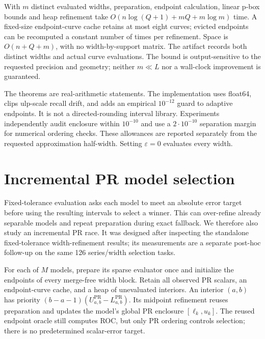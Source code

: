 With $m$ distinct evaluated widths, preparation, endpoint calculation,
linear p-box bounds and heap refinement take
$O(n\log(Q+1)+mQ+m\log m)$ time.
A fixed-size endpoint-curve cache retains at most eight curves; evicted
endpoints can be recomputed a constant number of times per refinement.
Space is $O(n+Q+m)$, with no width-by-support matrix.
The artifact records both distinct widths and actual curve evaluations.
The bound is output-sensitive to the requested precision and geometry;
neither $m\ll L$ nor a wall-clock improvement is guaranteed.

The theorems are real-arithmetic statements. The implementation uses
float64, clips ulp-scale recall drift, and adds an empirical $10^{-12}$
guard to adaptive endpoints. It is not a directed-rounding interval library.
Experiments independently audit enclosure within $10^{-10}$ and use a
$2\cdot10^{-10}$ separation margin for numerical ordering checks.
These allowances are reported separately from the requested approximation
half-width. Setting $\varepsilon=0$ evaluates every width.

\section{Incremental PR model selection}
\label{sec:racing}
Fixed-tolerance evaluation asks each model to meet an absolute error target
before using the resulting intervals to select a winner. This can over-refine
already separable models and repeat preparation during exact fallback.
We therefore also study an incremental PR race. It was designed after
inspecting the standalone fixed-tolerance width-refinement results;
its measurements are a separate
post-hoc follow-up on the same 126 series/width selection tasks.

For each of $M$ models, prepare its sparse evaluator once and initialize
the endpoints of every merge-free width block. Retain all observed PR scalars,
an endpoint-curve cache, and a heap of unevaluated interiors. An interior
$(a,\allowbreak b)$ has priority $(b-a-1)(U_{a,\allowbreak b}^{\mathrm{PR}}-L_{a,\allowbreak b}^{\mathrm{PR}})$.
Its midpoint refinement reuses preparation and updates the model's global
PR enclosure $[\ell_k,\allowbreak u_k]$. The reused endpoint oracle still computes ROC,
but only PR ordering controls selection; there is no predetermined
scalar-error target.

